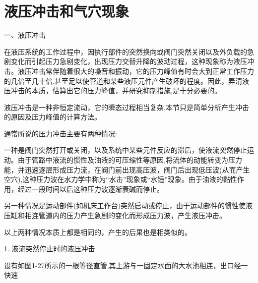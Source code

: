 \section{液压冲击和气穴现象}

\noindent 一、液压冲击

在液压系统的工作过程中，因执行部件的突然换向或阀门突然关闭以及外负载的急剧变化而引起压力急剧变化，出现压力交替升降的波动过程，这种现象称为液压冲击。液压冲击常伴随着很大的噪音和振动，它的压力峰值有时会大到正常工作压力的几倍至几十倍.甚至足以使管道和某些液压元件产生破坏的程度。因此，弄清液压冲击的本质，估算出它的压力峰值，并研究抑制措施,是十分必要的。

液压冲击是一种非恒定流动，它的瞬态过程相当复杂,本节只是简单分析产生冲击的原因及压力峰值的计算方法。

通常所说的压力冲击主要有两种情况:

一种是阀门突然打开或关闭，以及系统中某些元件反应的滞后，使液流突然停止运动。由于管路中液流的惯性及油液的可压缩性等原因,将流体的动能转变为压力能，并迅速逐层形成压力流，在阀门前出现高压波，阀门后出现低压波(从而产生空穴),这种压力波在水力学中称为“水击”现象或“水锤”现象。由于油液的黏性作用，经过一段时间以后这种压力波逐渐衰碱而停止。

另一种情况是运动部件(如机床工作台)突然启动或停止，由于运动部件的惯性使液压缸和相连管道内的压力产生急剧的变化而形成压力波，产生液压冲击。

以上两种情况本质上都是相同的，产生的后果也是相类似的。

1. 液流突然停止时的液压冲击

设有如图1-27所示的一根等径直管,其上游与一固定水面的大水池相连，出口经一快速




